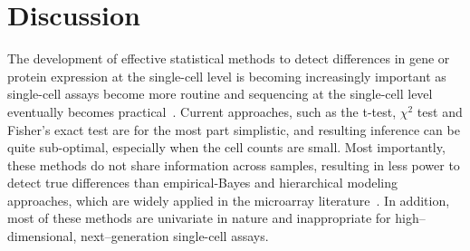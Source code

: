 \documentclass[12pt,oupdraft]{biostatistics}
\begin{document}
%

\section{Discussion}
\label{s:discussion}
The development of effective statistical methods to detect differences in gene or protein expression at the single-cell level is becoming increasingly important as single-cell assays become more routine and  sequencing at the single-cell level eventually becomes practical~\citep{Ramskold:2012gj}. Current approaches, such as the t-test, $\chi^2$ test and Fisher's exact test are for the most part simplistic, and resulting inference can be quite sub-optimal, especially when the cell counts are small. Most importantly, these methods do not share information across samples, resulting in less power to detect true differences than empirical-Bayes and hierarchical modeling approaches, which are widely applied in the microarray literature~\citep{Kendziorski:2003uw,Newton2004,Smyth:2005iy,Gottardo:2006}. In addition, most of these methods are univariate in nature and inappropriate for high--dimensional, next--generation single-cell assays.
\end{document}
